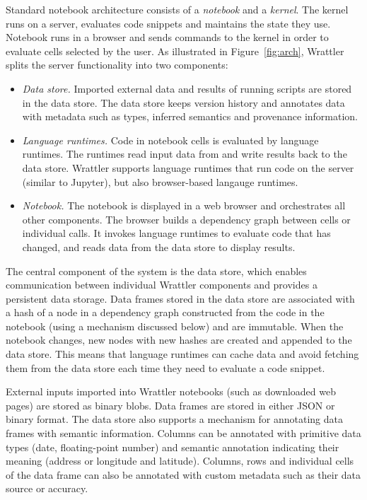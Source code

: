 \documentclass[fleqn,11pt]{report}
\theoremstyle{definition}
\begin{document}
Standard notebook architecture consists of a \emph{notebook} and a \emph{kernel}. The kernel
runs on a server, evaluates code snippets and maintains the state they use.
Notebook runs in a browser and sends commands to the kernel in order to evaluate
cells selected by the user. As illustrated in Figure~\ref{fig:arch}, Wrattler splits the
server functionality into two components:

\begin{itemize}
\item \emph{Data store.} Imported external data and results of running scripts
are stored in the data store. The data store keeps version history and annotates data with
metadata such as types, inferred semantics and provenance information.

\item \emph{Language runtimes.} Code in notebook cells is evaluated by language runtimes.
The runtimes read input data from and write results back to the data store. Wrattler supports
language runtimes that run code on the server (similar to Jupyter), but also browser-based
langauge runtimes.

\item \emph{Notebook.} The notebook is displayed in a web browser and orchestrates
all other components. The browser builds a dependency graph between cells or individual
calls. It invokes language runtimes to evaluate code that has changed,
and reads data from the data store to display results.
\end{itemize}

The central component of the system is the data store, which enables communication between
individual Wrattler components and provides a persistent data storage.
Data frames stored in the data store are associated with a hash of a node in a dependency
graph constructed from the code in the notebook (using a mechanism discussed below)
and are immutable. When the notebook changes, new nodes with new hashes are created and
appended to the data store. This means that language runtimes can cache data and avoid
fetching them from the data store each time they need to evaluate a code snippet.

External inputs imported into Wrattler notebooks (such as downloaded web pages) are stored as
binary blobs. Data frames are stored in either JSON or binary format.
The data store also supports a mechanism for annotating data frames with
semantic information. Columns can be annotated with primitive data types (date, floating-point
number) and semantic annotation indicating their meaning (address or longitude and latitude).
Columns, rows and individual cells of the data frame can also be annotated with custom metadata
such as their data source or accuracy.
\end{document}
